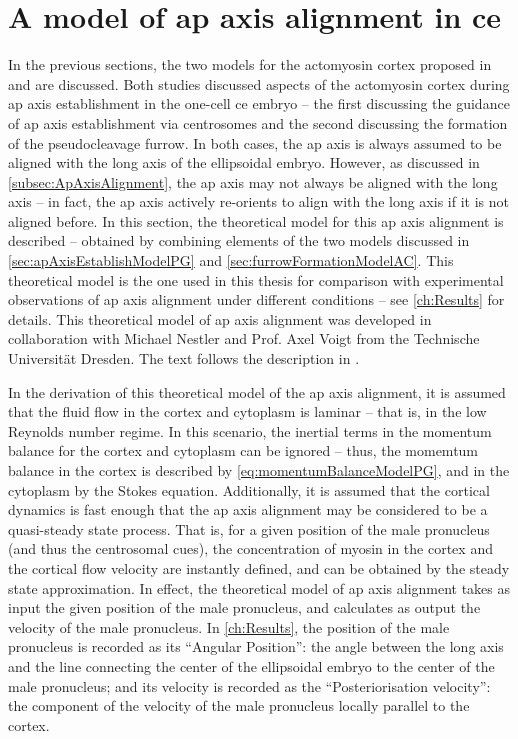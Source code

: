 \section{A model of \acs{ap} axis alignment in \acs{ce}}\label{sec:apAxisAlignmentModelMN}
In the previous sections, the two models for the actomyosin cortex proposed in \citep{gross2019guiding} and \citep{reymann2016cortical} are discussed. Both studies discussed aspects of the actomyosin cortex during \ac{ap} axis establishment in the one-cell \ac{ce} embryo -- the first discussing the guidance of \ac{ap} axis establishment via centrosomes and the second discussing the formation of the pseudocleavage furrow. In both cases, the \ac{ap} axis is always assumed to be aligned with the long axis of the ellipsoidal embryo. However, as discussed in \autoref{subsec:ApAxisAlignment}, the \ac{ap} axis may not always be aligned with the long axis -- in fact, the \ac{ap} axis actively re-orients to align with the long axis if it is not aligned before. In this section, the theoretical model for this \ac{ap} axis alignment is described -- obtained by combining elements of the two models discussed in \autoref{sec:apAxisEstablishModelPG} and \autoref{sec:furrowFormationModelAC}. This theoretical model is the one used in this thesis for comparison with experimental observations of \ac{ap} axis alignment under different conditions -- see \autoref{ch:Results} for details. This theoretical model of \ac{ap} axis alignment was developed in collaboration with Michael Nestler and Prof. Axel Voigt from the Technische Universit{\"a}t Dresden. The text follows the description in \citep{}.

In the derivation of this theoretical model of the \ac{ap} axis alignment, it is assumed that the fluid flow in the cortex and cytoplasm is laminar -- that is, in the low Reynolds number regime. In this scenario, the inertial terms in the momentum balance for the cortex and cytoplasm can be ignored -- thus, the momemtum balance in the cortex is described by \autoref{eq:momentumBalanceModelPG}, and in the cytoplasm by the Stokes equation. Additionally, it is assumed that the cortical dynamics is fast enough that the \ac{ap} axis alignment may be considered to be a quasi-steady state process. That is, for a given position of the male pronucleus (and thus the centrosomal cues), the concentration of myosin in the cortex and the cortical flow velocity are instantly defined, and can be obtained by the steady state approximation. In effect, the theoretical model of \ac{ap} axis alignment takes as input the given position of the male pronucleus, and calculates as output the velocity of the male pronucleus. In \autoref{ch:Results}, the position of the male pronucleus is recorded as its \enquote{Angular Position}: the angle between the long axis and the line connecting the center of the ellipsoidal embryo to the center of the male pronucleus; and its velocity is recorded as the \enquote{Posteriorisation velocity}: the component of the velocity of the male pronucleus locally parallel to the cortex. 

